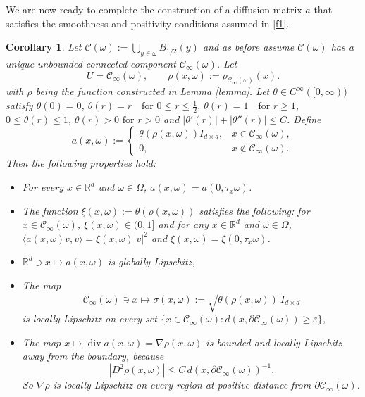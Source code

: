 \documentclass[11pt]{article}
\newcommand{\R}{\mathbb R}
\newtheorem{cor}[theorem]{Corollary}
\theoremstyle{rem}
\begin{document}
 We are now ready to complete the construction of a diffusion matrix $a$ that satisfies 
the smoothness and positivity conditions assumed in \ref{f1}. 

\begin{cor}\label{cor example a}
Let $\mathcal C(\omega):=\bigcup_{y\in\omega} B_{1/2}(y)$ 
and as before assume $\mathcal C(\omega)$ has a unique unbounded connected component $\mathcal C_\infty(\omega)$. Let
$$
U=\mathcal C_\infty(\omega),
\qquad
\rho(x,\omega):=\rho_{\mathcal C_\infty(\omega)}(x).
$$
with $\rho$ being the function constructed in Lemma \ref{lemma}. 
Let $\theta\in C^\infty([0,\infty))$ satisfy
$\theta(0)=0$, $\theta(r)=r \quad \text{for }0\le r\le \frac12$, 
$\theta(r)=1 \quad \text{for }r\ge 1$, 
$0\le \theta(r)\le 1$, 
$\theta(r)>0 \text{ for } r>0$ and 
$|\theta'(r)|+|\theta''(r)|\le C$.
Define
$$
a(x,\omega):=
\begin{cases}
\theta(\rho(x,\omega)) I_{d\times d},
& x\in \mathcal C_\infty(\omega),\\
0,
& x\notin \mathcal C_\infty(\omega).
\end{cases}
$$
Then the following properties hold:
\begin{itemize}
\item For every $x\in \R^d$ and $\omega\in \Omega$, $a(x,\omega)=a(0,\tau_x \omega)$.
\item The function $\xi(x,\omega):=\theta(\rho(x,\omega))$  satisfies the following:  
for $x\in \mathcal C_\infty(\omega)$, $\xi(x,\omega)\in(0,1]$ and for any $x\in \R^d$ and $\omega\in \Omega$, $\langle a(x,\omega)v,v\rangle
=\xi(x,\omega)|v|^2$ and $\xi(x,\omega)=\xi(0,\tau_x\omega)$. 
\item $\R^d\ni x \mapsto a(x,\omega)$ is globally Lipschitz, 
\item The map 
$$
\mathcal C_\infty(\omega)\ni x \mapsto \sigma(x,\omega):=\sqrt{\theta(\rho(x,\omega))}\, I_{d\times d}
$$ 
is locally Lipschitz on every set $\{x\in \mathcal C_\infty(\omega): d(x,\partial \mathcal C_\infty(\omega))\ge \varepsilon\}$, 
\item The map $x \mapsto \operatorname{div}a(x,\omega)=\nabla\rho(x,\omega)$ 
is bounded and locally Lipschitz away from the boundary, because 
\[
|D^2\rho(x,\omega)|\le C\, d(x,\partial \mathcal C_\infty(\omega))^{-1}.
\]
So $\nabla\rho$ is locally Lipschitz on every region at positive distance from $\partial \mathcal C_\infty(\omega)$.
\end{itemize} 
\end{cor}
\end{document}
